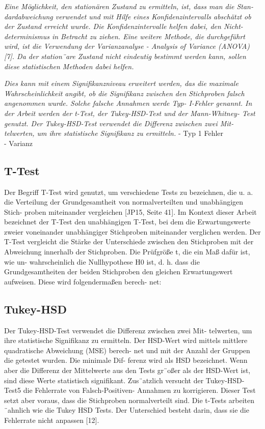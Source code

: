 \textit{Eine Möglichkeit, den stationären Zustand zu ermitteln, ist, dass man die Stan-
dardabweichung verwendet und mit Hilfe eines Konfidenzintervalls abschätzt ob
der Zustand erreicht wurde. Die Konfidenzintervalle helfen dabei, den Nicht-
determinismus in Betracht zu ziehen. Eine weitere Methode, die durchgeführt
wird, ist die Verwendung der Varianzanalyse - Analysis of Variance (ANOVA)
[7]. Da der station¨are Zustand nicht eindeutig bestimmt werden kann, sollen
diese statistischen Methoden dabei helfen.}

\textit{Dies kann mit einem Signifikanzniveau erweitert werden,
das die maximale Wahrscheinlichkeit angibt, ob die Signifikanz zwischen den
Stichproben falsch angenommen wurde. Solche falsche Annahmen werde Typ-
I-Fehler genannt.
In der Arbeit werden der t-Test, der Tukey-HSD-Test und der Mann-Whitney-
Test genutzt. Der Tukey-HSD-Test verwendet die Differenz zwischen zwei Mit-
telwerten, um ihre statistische Signifikanz zu ermitteln.}
- Typ 1 Fehler \\
- Varianz
\subsection{T-Test}
Der Begriff T-Test wird genutzt, um verschiedene Tests zu bezeichnen, die
u. a. die Verteilung der Grundgesamtheit von normalverteilten und unabhängigen Stich-
proben miteinander vergleichen [JP15, Seite 41]. Im Kontext dieser Arbeit bezeichnet
der T-Test den unabhängigen T-Test, bei dem die Erwartungswerte zweier voneinander
unabhängiger Stichproben miteinander verglichen werden.
Der T-Test vergleicht die Stärke der Unterschiede zwischen den Stichproben mit der
Abweichung innerhalb der Stichproben. Die Prüfgröße t, die ein Maß dafür ist, wie un-
wahrscheinlich die Nullhypothese H0 ist, d. h. dass die Grundgesamtheiten der beiden
Stichproben den gleichen Erwartungswert aufweisen. Diese wird folgendermaßen berech-
net:
\subsection{Tukey-HSD}
Der Tukey-HSD-Test verwendet die Differenz zwischen zwei Mit-
telwerten, um ihre statistische Signifikanz zu ermitteln.
Der HSD-Wert wird mittels mittlere quadratische Abweichung (MSE) berech-
net und mit der Anzahl der Gruppen die getestet wurden. Die minimale Dif-
ferenz wird als HSD bezeichnet. Wenn aber die Differenz der Mittelwerte aus
den Tests gr¨oßer als der HSD-Wert ist, sind diese Werte statistisch signifikant.
Zus¨atzlich versucht der Tukey-HSD-Test5 die Fehlerrate von Falsch-Positiven-
Annahmen zu korrigieren. Dieser Test setzt aber voraus, dass die Stichproben
normalverteilt sind. Die t-Tests arbeiten ¨ahnlich wie die Tukey HSD Tests. Der
Unterschied besteht darin, dass sie die Fehlerrate nicht anpassen [12]. 
